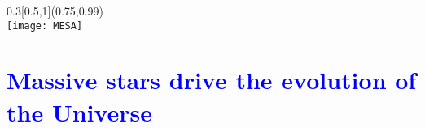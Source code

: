 \documentclass[xcolor=dvipsnames,professionalfonts, aspectratio=169]{beamer}
\begin{document}
\begin{frame}
{  }



  \begin{textblock}{0.3}[0.5,1](0.75,0.99)
    \centering
    \small
    \color{gray!50}{\tiny Simulation output from}\\
    \texttt{[image: MESA]}
  \end{textblock}
\end{frame}





\AtBeginSection[]{}
\section*{\textcolor{Blue}{Massive stars drive the evolution of the Universe}}
\end{document}
